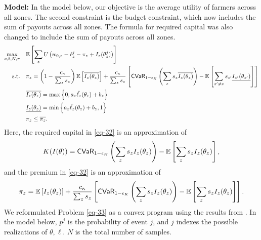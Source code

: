 \documentclass[12pt]{article}
\begin{document}
\noindent\textbf{Model:}
In the model below, our objective is the average utility of farmers across all zones. The second constraint is the budget constraint, which now includes the sum of payouts across all zones. The formula for required capital was also changed to include the sum of payouts across all zones. 
\begin{align}
\max_{a,b,K,\pi} &\quad \mathbb{E} \left [ \sum_z U\left ( w_{0,z} -\ell_z^j -\pi_z + I_z(\theta^j_z) \right ) \right ]\label{eq-33}\\
\text{s.t.} &\quad \pi_z  = \left (1-\frac{c_{\kappa}}{\sum_z s_z} \right)\mathbb{E}\left [ \overline{I_z(\theta_z)} \right ] + \frac{c_{\kappa}}{\sum_z s_z}  \left[{\sf CVaR}_{1-\epsilon_K} \left( \sum_z s_z\overline{I_z(\theta_z)} \right ) - \mathbb{E}\left [ \sum_{z' \neq z} s_{z'}\underline{I_{z'}(\theta_{z'})} \right ] \right] \label{eq-32}\\
&\quad \overline{I_z(\theta_z)} = \max \left \{0,a_z\hat{\ell_z}(\theta_z) + b_z \right \} \nonumber\\
&\quad\underline{I_z(\theta_z)} = \min \left \{a_z\hat{\ell_z}(\theta_z)+b_z,1 \right \} \nonumber\\
&\quad\pi_z \leq \overline{\pi_z} \nonumber.
\end{align}
Here, the required capital in \eqref{eq-32} is an approximation of      
\begin{equation}\label{eq-21}
   K(I(\theta)) = {\sf CVaR}_{1-\epsilon_K}\left(\sum_z s_z I_z(\theta_z)\right) - \mathbb{E}\left[\sum_z s_z I_z(\theta_z)\right],
\end{equation}
and the premium in \eqref{eq-32} is an approximation of
\begin{equation}\label{eq-25}
   \pi_z = \mathbb{E}\left [ {I_z(\theta_z)} \right ] + \frac{c_{\kappa}}{\sum_z s_z} \left[{\sf CVaR}_{1-\epsilon_K}\left(\sum_z s_z I_z(\theta_z)\right) - \mathbb{E}\left[\sum_z s_z I_z(\theta_z)\right]\right].
\end{equation}
We reformulated Problem \eqref{eq-33} as a convex program  using the results from \cite{rockafellar2000optimization}. In the model below, $p^j$ is the probability of event $j$, and $j$ indexes the possible realizations of $\theta, \ell$. $N$ is the total number of samples. 
\end{document}
